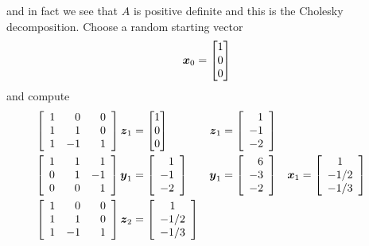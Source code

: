 \begin{example}
$$$$
and in fact we see that $A$ is positive definite and this is the Cholesky decomposition. Choose a random starting vector
$$
\boldsymbol{x}_0 = \begin{bmatrix} 1 \\ 0 \\ 0 \end{bmatrix}
$$
and compute
\begin{align*}
\left[ \begin{array}{rrr} 1 & 0 & 0 \\ 1 & 1 & 0 \\ 1 & -1 & \phantom{+}1 \end{array} \right] \bs{z}_1 &=  \begin{bmatrix} 1 \\ 0 \\ 0 \end{bmatrix}
& \bs{z}_1 &= \left[ \begin{array}{r} 1 \\ -1 \\ -2 \end{array} \right] \\
\left[ \begin{array}{rrr} 1 & 1 & 1 \\ 0 & 1 & -1 \\ 0 & \phantom{+}0 & 1 \end{array} \right] \bs{y}_1 &= \left[ \begin{array}{r} 1 \\ -1 \\ -2 \end{array} \right]
& \bs{y}_1 &= \left[ \begin{array}{r} 6 \\ -3 \\ -2 \end{array} \right] 
& \bs{x}_1 &= \left[ \begin{array}{c} 1 \\ -1/2 \\ -1/3 \end{array} \right] \\
\left[ \begin{array}{rrr} 1 & 0 & 0 \\ 1 & 1 & 0 \\ 1 & -1 & \phantom{+}1 \end{array} \right] \bs{z}_2 &= \left[ \begin{array}{c} 1 \\ -1/2 \\ -1/3 \end{array} \right]

\end{align*}
\end{example}
